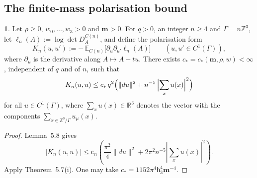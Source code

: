 \documentclass[11pt]{amsart}
\newcommand{\namedhead}{}
\theoremstyle{definition}
\newtheorem*{namedinner}{\namedhead}
\newenvironment{named}[1]{\renewcommand{\namedhead}{#1}\begin{namedinner}}{\end{namedinner}}
\begin{document}
\subsection{The finite-mass polarisation bound}
\begin{named}{Lemma 5.2}
Let $\rho\ge0$, $w_0,\dots,w_3>0$ and $\mathbf m>0$.
For $q>0$, an integer $n\ge4$ and $\Gamma=n\mathbb Z^3$, let $\ell_n(A):=\log\det D^{C(n)}_A$, and define the polarisation form
\begin{equation*}
K_n(u,u'):=-\,\mathbb E_{C(n)}\bigl[\partial_u\partial_{u'}\ell_n(A)\bigr]\qquad(u,u'\in C^1(\Gamma)),
\end{equation*}
where $\partial_u$ is the derivative along $A\mapsto A+tu$.
There exists $c_*=c_*(\mathbf m,\rho,w)<\infty$, independent of $q$ and of $n$, such that
\begin{equation*}
K_n(u,u)\le c_*\,q^2\Bigl(\|du\|^2+n^{-5}\,\Bigl|\sum_xu(x)\Bigr|^2\Bigr)
\end{equation*}
for all $u\in C^1(\Gamma)$, where $\sum_xu(x)\in\mathbb R^3$ denotes the vector with the components $\sum_{x\in\mathbb Z^3/\Gamma}u_\mu(x)$.
\end{named}


\begin{proof}
Lemma~5.8 gives
\[
|K_n(u,u)|\le\mathsf c_n\left(\frac{\pi^2}{4}\|du\|^2
+2\pi^2n^{-5}\left|\sum_xu(x)\right|^2\right).
\]
Apply Theorem~5.7(i). One may take
$c_*=1152\pi^4\mathsf h_3^4\mathbf m^{-4}$.
\end{proof}
\end{document}
